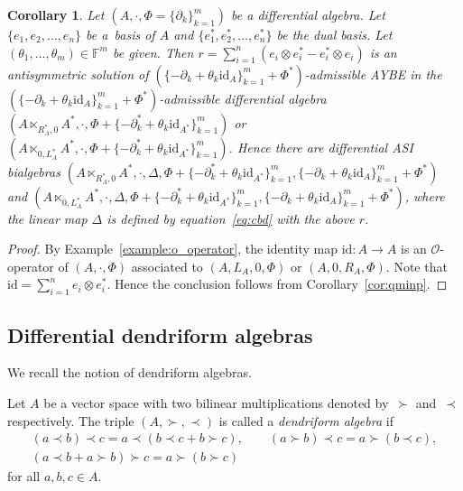 \documentclass[pdftex]{sigma}
\numberwithin{equation}{section}
\newtheorem{Corollary}[Theorem]{Corollary}
\newcommand{\id}{\mathrm{id}}
\begin{document}
\begin{Corollary}\label{cor:idoop}
 Let $(A, \cdot, \Phi = \{\partial_k\}_{k=1}^m)$ be a differential algebra. Let $\{e_1, e_2, \dots, e_n\}$ be a~basis of $A$ and $\{e_1^*,e_2^*, \dots, e_n^*\}$ be the dual basis.
 Let $(\theta_1, \dots, \theta_m) \in \mathbb{F}^m$ be given.
 Then $r = \sum_{i=1}^n (e_i \otimes e_i^* - e_i^* \otimes e_i)$ is an antisymmetric solution of
 $(\{-\partial_k + \theta_k \id_A\}_{k=1}^m + \Phi^*)$-admissible AYBE in the
 $(\{-\partial_k + \theta_k \id_A\}_{k=1}^m +
 \Phi^*)$-admissible
 differential algebra $(A \ltimes_{R_A^*, 0}A^*, \cdot ,\Phi + \{-\partial_k^* + \theta_k \id_{A^*}\}_{k=1}^m)$ or $(A \ltimes_{0, L_A^*}A^*, \cdot ,\Phi + \{-\partial_k^* + \theta_k \id_{A^*}\}_{k=1}^m)$.
 Hence there are differential ASI bialgebras
 $(A \ltimes_{R_A^*, 0}A^*, \cdot, \Delta, \Phi + \{-\partial_k^* + \theta_k \id_{A^*}\}_{k=1}^m, \{-\partial_k + \theta_k \id_A\}_{k=1}^m + \Phi^*)$ and
 $(A \ltimes_{0, L_A^*}A^*, \cdot, \Delta, \Phi + \{-\partial_k^* + \theta_k \id_{A^*}\}_{k=1}^m, \{-\partial_k + \theta_k \id_A\}_{k=1}^m + \Phi^*)$,
 where the linear map $\Delta$ is defined by equation~\eqref{eq:cbd}
 with the above $r$.
\end{Corollary}
\begin{proof}
 By Example~\ref{example:o_operator},
 the identity map $\id\colon A \to A$ is an $\mathcal{O}$-operator of $(A, \cdot, \Phi)$ associated to $(A, L_A, 0,\Phi)$ or $(A, 0, R_A, \Phi)$.
 Note that $\id = \sum_{i=1}^n e_i \otimes e_i^*$.
 Hence the conclusion follows from Corollary~\ref{cor:qminp}.
\end{proof}

\subsection{Differential dendriform algebras}\label{subsec:dendriform}

We recall the notion of dendriform algebras.

\begin{Definition}
 Let $A$ be a vector space with two bilinear multiplications denoted by~$\succ$ and~$\prec$ respectively.
 The triple $(A, \succ, \prec)$ is called a \textit{dendriform algebra} if
 \begin{gather*}
 (a \prec b) \prec c = a \prec (b \prec c +b \succ c), \qquad
 (a \succ b) \prec c = a \succ (b \prec c), \\
 (a \prec b + a \succ b) \succ c = a \succ (b \succ c)
 \end{gather*}
	for all $a, b, c \in A$.
\end{Definition}
\end{document}

